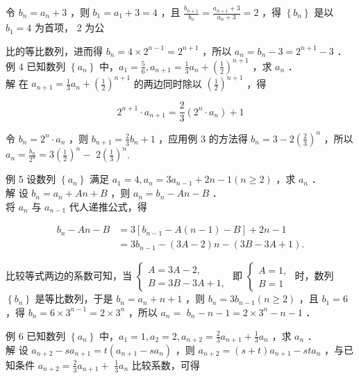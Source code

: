 \documentclass[10pt]{article}
\begin{document}
令 \(b_{n}=a_{n}+3\) ，则 \(b_{1}=a_{1}+3=4\) ，且 \(\frac{b_{n+1}}{b_{n}}=\frac{a_{n+1}+3}{a_{n}+3}=2\) ，得 \(\left\{b_{n}\right\}\) 是以 \(b_{1}=4\) 为首项， 2 为公

比的等比数列，进而得 \(b_{n}=4 \times 2^{n-1}=2^{n+1}\) ，所以 \(a_{n}=b_{n}-3=2^{n+1}-3\) ．\\
例 4 已知数列 \(\left\{a_{n}\right\}\) 中，\(a_{1}=\frac{5}{6}, a_{n+1}=\frac{1}{3} a_{n}+\left(\frac{1}{2}\right)^{n+1}\) ，求 \(a_{n}\) ．\\
解 在 \(a_{n+1}=\frac{1}{3} a_{n}+\left(\frac{1}{2}\right)^{n+1}\) 的两边同时除以 \(\left(\frac{1}{2}\right)^{n+1}\) ，得

\[
2^{n+1} \cdot a_{n+1}=\frac{2}{3}\left(2^{n} \cdot a_{n}\right)+1
\]

令 \(b_{n}=2^{n} \cdot a_{n}\) ，则 \(b_{n+1}=\frac{2}{3} b_{n}+1\) ，应用例 3 的方法得 \(b_{n}=3-2\left(\frac{2}{3}\right)^{n}\) ，所以 \(a_{n}=\frac{b_{n}}{2^{n}}=3\left(\frac{1}{2}\right)^{n}-\) \(2\left(\frac{1}{3}\right)^{n}\).

例 5 设数列 \(\left\{a_{n}\right\}\) 满足 \(a_{1}=4, a_{n}=3 a_{n-1}+2 n-1(n \geqslant 2)\) ，求 \(a_{n}\) ．\\
解 设 \(b_{n}=a_{n}+A n+B\) ，则 \(a_{n}=b_{n}-A n-B\) ．\\
将 \(a_{n}\) 与 \(a_{n-1}\) 代人递推公式，得

\[
\begin{aligned}
b_{n}-A n-B & =3\left[b_{n-1}-A(n-1)-B\right]+2 n-1 \\
& =3 b_{n-1}-(3 A-2) n-(3 B-3 A+1) .
\end{aligned}
\]

比较等式两边的系数可知，当 \(\left\{\begin{array}{l}A=3 A-2, \\ B=3 B-3 A+1,\end{array}\right.\) 即 \(\left\{\begin{array}{l}A=1, \\ B=1\end{array}\right.\) 时，数列 \(\left\{b_{n}\right\}\) 是等比数列，于是 \(b_{n}=a_{n}+n+1\) ，则 \(b_{n}=3 b_{n-1}(n \geqslant 2)\) ，且 \(b_{1}=6\) ，得 \(b_{n}=6 \times 3^{n-1}=2 \times 3^{n}\) ，所以 \(a_{n}=\) \(b_{n}-n-1=2 \times 3^{n}-n-1\) ．

例 6 已知数列 \(\left\{a_{n}\right\}\) 中，\(a_{1}=1, a_{2}=2, a_{n+2}=\frac{2}{3} a_{n+1}+\frac{1}{3} a_{n}\) ，求 \(a_{n}\) ．\\
解 设 \(a_{n+2}-s a_{n+1}=t\left(a_{n+1}-s a_{n}\right)\) ，则 \(a_{n+2}=(s+t) a_{n+1}-s t a_{n}\) ，与已知条件 \(a_{n+2}=\frac{2}{3} a_{n+1}+\) \(\frac{1}{3} a_{n}\) 比较系数，可得
\end{document}
